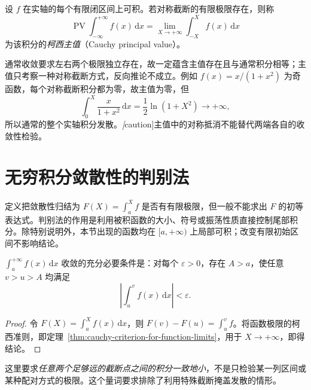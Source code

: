 \begin{definition}[无穷积分的柯西主值]
\label{def:cauchy-principal-value-at-infinity}
设 $f$ 在实轴的每个有限闭区间上可积。若对称截断的有限极限存在，则称
\begin{equation}
    \operatorname{PV}\int_{-\infty}^{+\infty}f(x)\,\mathrm{d}x
    =\lim_{X\to+\infty}\int_{-X}^X f(x)\,\mathrm{d}x
    \label{eq:cauchy-principal-value-infinity}
\end{equation}
为该积分的\emph{柯西主值}（Cauchy principal value）。
\end{definition}

通常收敛要求左右两个极限独立存在，故一定蕴含主值存在且与通常积分相等；主值只考察一种对称截断方式，反向推论不成立。例如 $f(x)=x/(1+x^2)$ 为奇函数，每个对称截断积分都为零，故主值为零，但
\[
    \int_0^X\frac{x}{1+x^2}\,\mathrm{d}x=\frac12\ln(1+X^2)\to+\infty,
\]
所以通常的整个实轴积分发散。\emph[caution]{主值中的对称抵消不能替代两端各自的收敛性检验。}

\section{无穷积分敛散性的判别法}
\label{sec:convergence-tests-for-infinite-integrals}

定义把敛散性归结为 $F(X)=\int_a^X f$ 是否有有限极限，但一般不能求出 $F$ 的初等表达式。判别法的作用是利用被积函数的大小、符号或振荡性质直接控制尾部积分。除特别说明外，本节出现的函数均在 $[a,+\infty)$ 上局部可积；改变有限初始区间不影响结论。

\begin{theorem}[无穷积分的柯西准则]
\label{thm:cauchy-criterion-improper-integrals}
$\int_a^{+\infty}f(x)\,\mathrm{d}x$ 收敛的充分必要条件是：对每个 $\varepsilon>0$，存在 $A>a$，使任意 $v>u>A$ 均满足
\begin{equation}
    \left|\int_u^v f(x)\,\mathrm{d}x\right|<\varepsilon.
    \label{eq:improper-integral-cauchy-tail}
\end{equation}
\end{theorem}

\begin{proof}
令 $F(X)=\int_a^X f(x)\,\mathrm{d}x$，则 $F(v)-F(u)=\int_u^v f$。将函数极限的柯西准则，即定理~\ref{thm:cauchy-criterion-for-function-limits}，用于 $X\to+\infty$，即得结论。
\end{proof}

这里要求\emph{任意两个足够远的截断点之间的积分一致地小}，不是只检验某一列区间或某种配对方式的极限。这个量词要求排除了利用特殊截断掩盖发散的情形。

